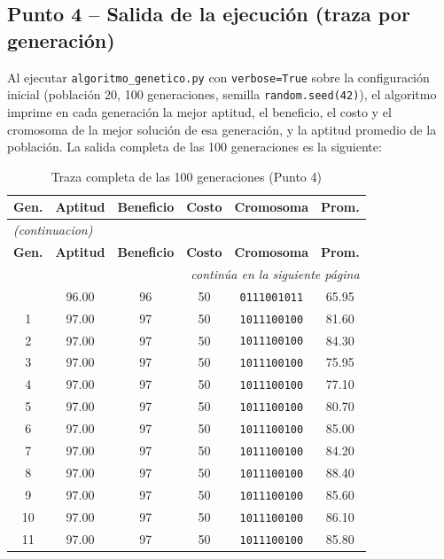 \documentclass[12pt,a4paper]{article}
\begin{document}
\subsection{Punto 4 -- Salida de la ejecuci\'{o}n (traza por generaci\'{o}n)}

Al ejecutar \texttt{algoritmo\_genetico.py} con
\texttt{verbose=True} sobre la configuraci\'{o}n inicial (poblaci\'{o}n
20, 100 generaciones, semilla \texttt{random.seed(42)}), el
algoritmo imprime en cada generaci\'{o}n la mejor aptitud, el
beneficio, el costo y el cromosoma de la mejor soluci\'{o}n de esa
generaci\'{o}n, y la aptitud promedio de la poblaci\'{o}n. La salida
completa de las 100 generaciones es la siguiente:

{\small
\centering
\begin{longtable}{c c c c c c}
\caption{Traza completa de las 100 generaciones (Punto 4)} \label{tab:traza-punto4} \\
\toprule
\textbf{Gen.} & \textbf{Aptitud} & \textbf{Beneficio} & \textbf{Costo} & \textbf{Cromosoma} & \textbf{Prom.} \\
\midrule
\endfirsthead
\multicolumn{6}{l}{\textit{(continuacion)}} \\
\toprule
\textbf{Gen.} & \textbf{Aptitud} & \textbf{Beneficio} & \textbf{Costo} & \textbf{Cromosoma} & \textbf{Prom.} \\
\midrule
\endhead
\midrule
\multicolumn{6}{r}{\textit{contin\'{u}a en la siguiente p\'{a}gina}} \\
\endfoot
\bottomrule
\endlastfoot
0 & 96.00 & 96 & 50 & \texttt{0111001011} & 65.95 \\
1 & 97.00 & 97 & 50 & \texttt{1011100100} & 81.60 \\
2 & 97.00 & 97 & 50 & \texttt{1011100100} & 84.30 \\
3 & 97.00 & 97 & 50 & \texttt{1011100100} & 75.95 \\
4 & 97.00 & 97 & 50 & \texttt{1011100100} & 77.10 \\
5 & 97.00 & 97 & 50 & \texttt{1011100100} & 80.70 \\
6 & 97.00 & 97 & 50 & \texttt{1011100100} & 85.00 \\
7 & 97.00 & 97 & 50 & \texttt{1011100100} & 84.20 \\
8 & 97.00 & 97 & 50 & \texttt{1011100100} & 88.40 \\
9 & 97.00 & 97 & 50 & \texttt{1011100100} & 85.60 \\
10 & 97.00 & 97 & 50 & \texttt{1011100100} & 86.10 \\
11 & 97.00 & 97 & 50 & \texttt{1011100100} & 85.80 \\

\end{longtable}}
\end{document}
